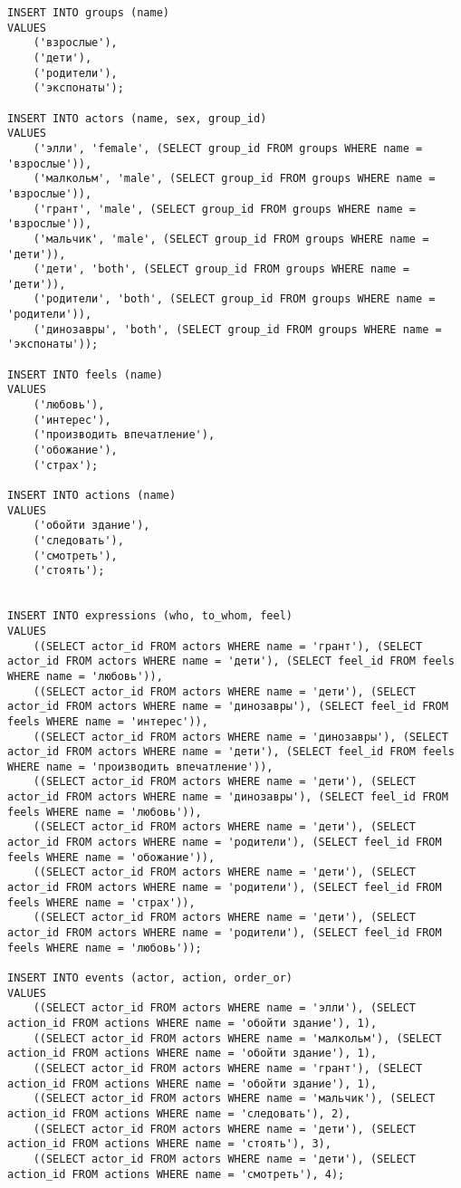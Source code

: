 
\begin{verbatim}
INSERT INTO groups (name)
VALUES
    ('взрослые'),
    ('дети'),
    ('родители'),
    ('экспонаты');

INSERT INTO actors (name, sex, group_id)
VALUES
    ('элли', 'female', (SELECT group_id FROM groups WHERE name = 'взрослые')),
    ('малкольм', 'male', (SELECT group_id FROM groups WHERE name = 'взрослые')),
    ('грант', 'male', (SELECT group_id FROM groups WHERE name = 'взрослые')),
    ('мальчик', 'male', (SELECT group_id FROM groups WHERE name = 'дети')),
    ('дети', 'both', (SELECT group_id FROM groups WHERE name = 'дети')),
    ('родители', 'both', (SELECT group_id FROM groups WHERE name = 'родители')),
    ('динозавры', 'both', (SELECT group_id FROM groups WHERE name = 'экспонаты'));

INSERT INTO feels (name)
VALUES
    ('любовь'),
    ('интерес'),
    ('производить впечатление'),
    ('обожание'),
    ('страх');

INSERT INTO actions (name)
VALUES
    ('обойти здание'),
    ('следовать'),
    ('смотреть'),
    ('стоять');


INSERT INTO expressions (who, to_whom, feel)
VALUES
    ((SELECT actor_id FROM actors WHERE name = 'грант'), (SELECT actor_id FROM actors WHERE name = 'дети'), (SELECT feel_id FROM feels WHERE name = 'любовь')),
    ((SELECT actor_id FROM actors WHERE name = 'дети'), (SELECT actor_id FROM actors WHERE name = 'динозавры'), (SELECT feel_id FROM feels WHERE name = 'интерес')),
    ((SELECT actor_id FROM actors WHERE name = 'динозавры'), (SELECT actor_id FROM actors WHERE name = 'дети'), (SELECT feel_id FROM feels WHERE name = 'производить впечатление')),
    ((SELECT actor_id FROM actors WHERE name = 'дети'), (SELECT actor_id FROM actors WHERE name = 'динозавры'), (SELECT feel_id FROM feels WHERE name = 'любовь')),
    ((SELECT actor_id FROM actors WHERE name = 'дети'), (SELECT actor_id FROM actors WHERE name = 'родители'), (SELECT feel_id FROM feels WHERE name = 'обожание')),
    ((SELECT actor_id FROM actors WHERE name = 'дети'), (SELECT actor_id FROM actors WHERE name = 'родители'), (SELECT feel_id FROM feels WHERE name = 'страх')),
    ((SELECT actor_id FROM actors WHERE name = 'дети'), (SELECT actor_id FROM actors WHERE name = 'родители'), (SELECT feel_id FROM feels WHERE name = 'любовь'));

INSERT INTO events (actor, action, order_or)
VALUES
    ((SELECT actor_id FROM actors WHERE name = 'элли'), (SELECT action_id FROM actions WHERE name = 'обойти здание'), 1),
    ((SELECT actor_id FROM actors WHERE name = 'малкольм'), (SELECT action_id FROM actions WHERE name = 'обойти здание'), 1),
    ((SELECT actor_id FROM actors WHERE name = 'грант'), (SELECT action_id FROM actions WHERE name = 'обойти здание'), 1),
    ((SELECT actor_id FROM actors WHERE name = 'мальчик'), (SELECT action_id FROM actions WHERE name = 'следовать'), 2),
    ((SELECT actor_id FROM actors WHERE name = 'дети'), (SELECT action_id FROM actions WHERE name = 'стоять'), 3),
    ((SELECT actor_id FROM actors WHERE name = 'дети'), (SELECT action_id FROM actions WHERE name = 'смотреть'), 4);
\end{verbatim}